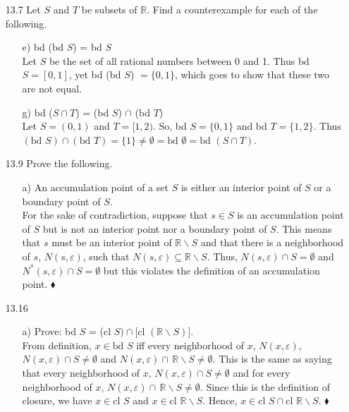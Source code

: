 \documentclass[12pt]{article}
\begin{document}
\begin{enumerate}
\begin{enumerate}
\item[13.7] Let $S$ and $T$ be subsets of $\mathbb{R}$. Find a counterexample for each of the following.
\begin{enumerate}
\item[e)] bd (bd $S$) = bd $S$ \\
Let $S$ be the set of all rational numbers between 0 and 1. Thus bd $S = [0, 1]$, yet
bd (bd $S$) $= \{0, 1\}$, which goes to show that these two are not equal.
\item[g)] bd ($S \cap T$) = (bd $S$) $\cap$ (bd $T$) \\
Let $S = (0, 1)$ and $T = [1, 2)$. So, bd $S = \{0, 1\}$ and bd $T = \{1, 2\}$. Thus
$(\mbox{bd } S) \cap (\mbox{bd } T) = \{1\} \neq \emptyset = \mbox{bd }\emptyset = \mbox{bd }(S \cap T)$.
\end{enumerate}

\item[13.9] Prove the following.
\begin{enumerate}
\item[a)] An accumulation point of a set $S$ is either an interior point of $S$ or a boundary point of $S$. \\
For the sake of contradiction, suppose that $s \in S$ is an accumulation point of $S$ but is not an interior point nor a boundary point of $S$. This means that $s$ must be an interior point of $\mathbb{R}\backslash S$ and that there is a neighborhood of $s$, $N(s, \varepsilon )$, such that $N(s, \varepsilon ) \subseteq \mathbb{R}\backslash S$. Thus, $N(s, \varepsilon ) \cap S = \emptyset$ and $N^*(s, \varepsilon ) \cap S = \emptyset$ but this violates the definition of an accumulation point.
$\blacklozenge$
\end{enumerate}

\item[13.16] 
\begin{enumerate}
\item[a)] Prove: bd $S$ = (cl $S) \cap [$cl $(\mathbb{R}\backslash S)]$. \\
From definition, $x \in \mbox{bd } S$ iff every neighborhood of $x$, $N(x, \varepsilon)$, 
$N(x, \varepsilon) \cap S \neq \emptyset$ and $N(x, \varepsilon) \cap \,\mathbb{R}\backslash S 
\neq \emptyset$. This is the same as saying that every neighborhood of $x$, 
$N(x, \varepsilon) \cap S \neq \emptyset$ and for every neighborhood of $x$, 
$N(x, \varepsilon) \cap \,\mathbb{R}\backslash S \neq \emptyset$. Since this is the definition of
closure, we have $x \in \mbox{cl }S$ and $x \in \mbox{cl }\mathbb{R}\backslash S$. Hence, 
$x \in \mbox{cl }S \cap \mbox{cl }\mathbb{R}\backslash S$. $\blacklozenge$


\end{enumerate}
\end{enumerate}
\end{enumerate}
\end{document}
